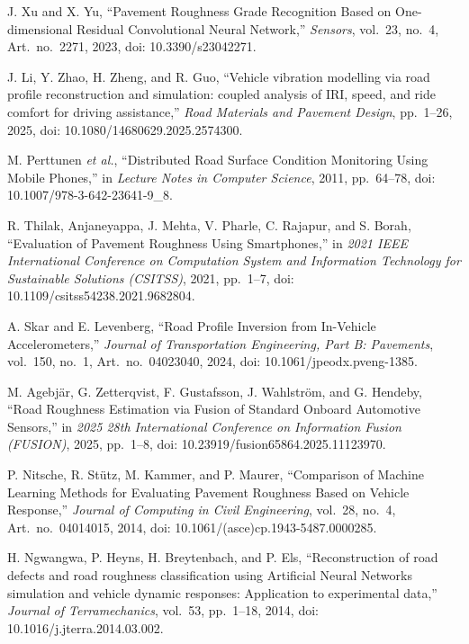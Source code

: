 J. Xu and X. Yu, ``Pavement Roughness Grade Recognition Based on One-dimensional Residual Convolutional Neural Network,'' \emph{Sensors}, vol.~23, no.~4, Art.~no.~2271, 2023, doi: 10.3390/s23042271.

J. Li, Y. Zhao, H. Zheng, and R. Guo, ``Vehicle vibration modelling via road profile reconstruction and simulation: coupled analysis of IRI, speed, and ride comfort for driving assistance,'' \emph{Road Materials and Pavement Design}, pp.~1--26, 2025, doi: 10.1080/14680629.2025.2574300.

M. Perttunen \emph{et al.}, ``Distributed Road Surface Condition Monitoring Using Mobile Phones,'' in \emph{Lecture Notes in Computer Science}, 2011, pp.~64--78, doi: 10.1007/978-3-642-23641-9_8.

R. Thilak, Anjaneyappa, J. Mehta, V. Pharle, C. Rajapur, and S. Borah, ``Evaluation of Pavement Roughness Using Smartphones,'' in \emph{2021 IEEE International Conference on Computation System and Information Technology for Sustainable Solutions (CSITSS)}, 2021, pp.~1--7, doi: 10.1109/csitss54238.2021.9682804.

A. Skar and E. Levenberg, ``Road Profile Inversion from In-Vehicle Accelerometers,'' \emph{Journal of Transportation Engineering, Part B: Pavements}, vol.~150, no.~1, Art.~no.~04023040, 2024, doi: 10.1061/jpeodx.pveng-1385.

M. Agebjär, G. Zetterqvist, F. Gustafsson, J. Wahlström, and G. Hendeby, ``Road Roughness Estimation via Fusion of Standard Onboard Automotive Sensors,'' in \emph{2025 28th International Conference on Information Fusion (FUSION)}, 2025, pp.~1--8, doi: 10.23919/fusion65864.2025.11123970.

P. Nitsche, R. Stütz, M. Kammer, and P. Maurer, ``Comparison of Machine Learning Methods for Evaluating Pavement Roughness Based on Vehicle Response,'' \emph{Journal of Computing in Civil Engineering}, vol.~28, no.~4, Art.~no.~04014015, 2014, doi: 10.1061/(asce)cp.1943-5487.0000285.

H. Ngwangwa, P. Heyns, H. Breytenbach, and P. Els, ``Reconstruction of road defects and road roughness classification using Artificial Neural Networks simulation and vehicle dynamic responses: Application to experimental data,'' \emph{Journal of Terramechanics}, vol.~53, pp.~1--18, 2014, doi: 10.1016/j.jterra.2014.03.002.

